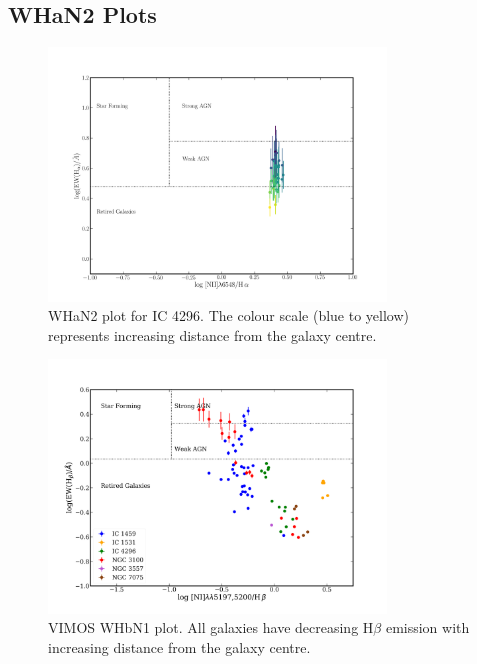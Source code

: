 	\subsection{WHaN2 Plots}
		\label{subsec:WHaN2}
		\begin{figure}
			\centering
			\includegraphics[width=0.8\textwidth]{chapter5/WHaN2.png}
			\caption[WHaN2 plot for IC 4296]{WHaN2 plot for IC 4296. The colour scale (blue to yellow) represents increasing distance from the galaxy centre.}
			\label{fig:WHaN2}
		\end{figure}

		\begin{figure}
			\centering
			\includegraphics[width=0.8\textwidth]{chapter5/WHbN1.png}
			\caption[VIMOS WHbN1 plot]{VIMOS WHbN1 plot. All galaxies have decreasing H$\beta$ emission with increasing distance from the galaxy centre.}
			\label{fig:WHbN1}
		\end{figure}

